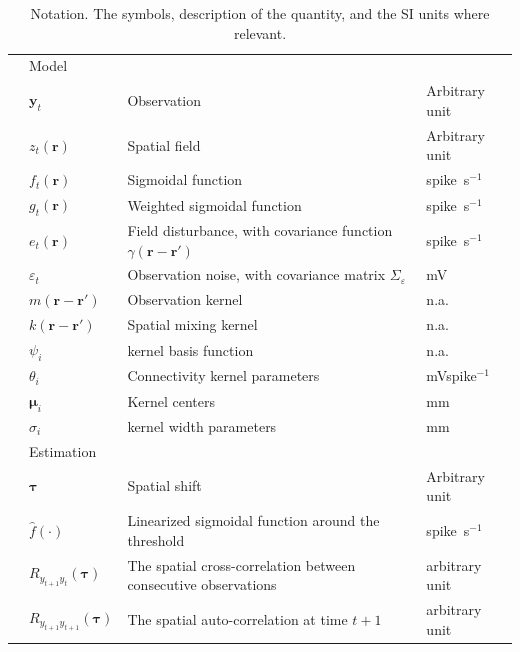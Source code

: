 \documentclass[10pt,twocolumn,twoside]{IEEEtran}
\begin{document}
\begin {table}[t]
\begin{center}
{\begin{tabular}{llll}
	& Model&& \\
	& $\mathbf{y}_t$ & Observation & Arbitrary unit \\
	& $z_t(\mathbf{r})$ & Spatial field & Arbitrary unit \\ 
	& $f_t(\mathbf{r})$ & Sigmoidal function & spike~s$^{-1}$ \\ 
	& $g_t(\mathbf{r})$ & Weighted sigmoidal function & spike~s$^{-1}$ \\
 	& $e_t(\mathbf{r})$ & Field disturbance, with covariance function $\gamma(\mathbf{r}-\mathbf{r'})$  & spike~s$^{-1}$ \\
 	& $\varepsilon_t$ & Observation noise, with covariance matrix $\Sigma_{\varepsilon}$  & mV \\  
 	& $m(\mathbf{r}-\mathbf{r'})$ & Observation kernel& n.a. \\  
 	& $k(\mathbf{r}-\mathbf{r'})$ & Spatial mixing kernel& n.a. \\ 
	&$\psi_i$&kernel basis function&n.a.\\
	&$\theta_i$ &Connectivity kernel parameters&mVspike$^{-1}$ \\ 
	& $\boldsymbol\mu_i$ &Kernel centers& mm \\  
	& $\sigma_{i}$ &kernel width parameters&mm \\ 
	& Estimation&& \\
 	& $\boldsymbol\tau$ &Spatial shift& Arbitrary unit \\
  & $\hat{f}(\cdot)$ &Linearized sigmoidal function around the threshold& spike~s$^{-1}$ \\  
  & $R_{y_{t+1}y_t}(\boldsymbol{\tau}) $ &The spatial cross-correlation between consecutive observations& arbitrary unit \\  
  & $R_{y_{t+1}y_{t+1}}(\boldsymbol{\tau})$ & The spatial auto-correlation at time $t+1$& arbitrary unit \\    
 	\hline \hline
	\end{tabular}}
 \caption {Notation. 	The symbols, description of the quantity, and the SI units where relevant.} 
 \label{table:Notation}
 \end{center}
 \end {table} 
\end{document}
